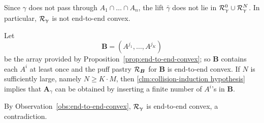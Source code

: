 Since $\gamma$ does not pass  through $A_1\cap\dots\cap A_n$,
the lift $\bar\gamma$ does not lie in  $\spc{R}_\gamma^0\cup \spc{R}_\gamma^N$.
In particular, $\mathcal{R}_\upgamma$ is not end-to-end convex.

Let 
\[\bm{B}=(A^{j_1},\dots,A^{j_K})\] 
be the array provided by Proposition~\ref{prop:end-to-end-convex};
so $\bm{B}$ contains each $A^i$ at least once
and the puff pastry $\mathcal{R}_{\bm{B}}$ for $\bm{B}$ is end-to-end convex.
If $N$ is sufficiently large, namely $N\ge K\cdot M$, then
 \ref{clm:collision-induction hypothesis}
implies that $\bm{A}_\gamma$ can be obtained  
by inserting a finite number of $A^i$'s in $\bm{B}$.

By Observation~\ref{obs:end-to-end-convex}, 
$\mathcal{R}_\upgamma$ is end-to-end convex,
a contradiction.
\qeds
